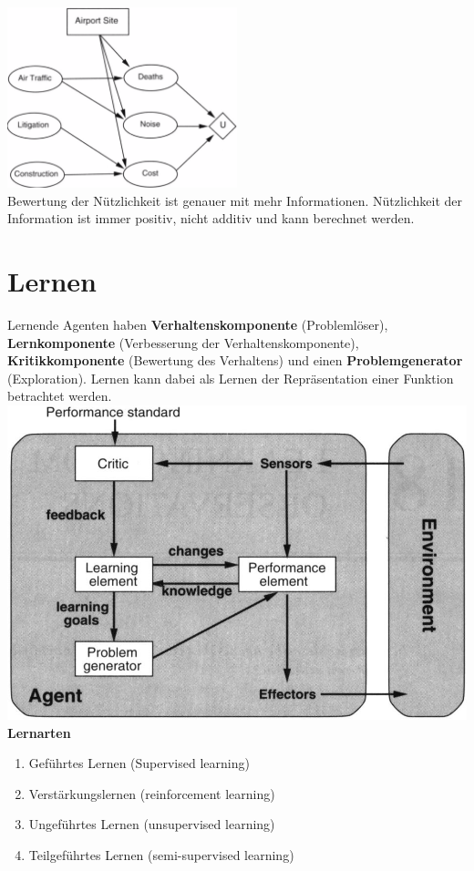 \documentclass[12pt]{article}
\begin{document}
	\includegraphics[width=0.5\textwidth]{figures/entscheidungsnetz.png}\\
	Bewertung der Nützlichkeit ist genauer mit mehr Informationen. Nützlichkeit der Information ist immer positiv, nicht additiv und kann berechnet werden.
	
	\section{Lernen}
	Lernende Agenten haben \textbf{Verhaltenskomponente} (Problemlöser), \textbf{Lernkomponente} (Verbesserung der Verhaltenskomponente), \textbf{Kritikkomponente} (Bewertung des Verhaltens) und einen \textbf{Problemgenerator} (Exploration). Lernen kann dabei als Lernen der Repräsentation einer Funktion betrachtet werden.\\
	\includegraphics[width=\linewidth]{figures/lernender-agent.JPG}\\
	\textbf{Lernarten}
	\begin{enumerate}
		\item Geführtes Lernen (Supervised learning)
		\item Verstärkungslernen (reinforcement learning)
		\item Ungeführtes Lernen (unsupervised learning)
		\item Teilgeführtes Lernen (semi-supervised learning)
	\end{enumerate}
\end{document}

